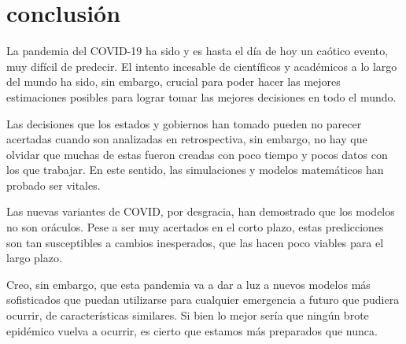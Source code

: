 \section{conclusión}
La pandemia del COVID-19 ha sido y es hasta el día de hoy un caótico evento, muy difícil de predecir. El intento incesable de científicos y académicos a lo largo del mundo ha sido, sin embargo, crucial para poder hacer las mejores estimaciones posibles para lograr tomar las mejores decisiones en todo el mundo.

Las decisiones que los estados y gobiernos han tomado pueden no parecer acertadas cuando son analizadas en retrospectiva, sin embargo, no hay que olvidar que muchas de estas fueron creadas con poco tiempo y pocos datos con los que trabajar. En este sentido, las simulaciones y modelos matemáticos han probado ser vitales.

Las nuevas variantes de COVID, por desgracia, han demostrado que los modelos no son oráculos. Pese a ser muy acertados en el corto plazo, estas predicciones son tan susceptibles a cambios inesperados, que las hacen poco viables para el largo plazo.

Creo, sin embargo, que esta pandemia va a dar a luz a nuevos modelos más sofisticados que puedan utilizarse para cualquier emergencia a futuro que pudiera ocurrir, de características similares. Si bien lo mejor sería que ningún brote epidémico vuelva a ocurrir, es cierto que estamos más preparados que nunca.
